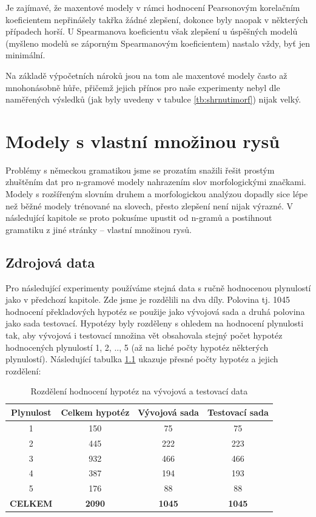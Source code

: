 \documentclass[12pt,a4paper]{report}
\begin{document}
Je zajímavé, že maxentové modely v rámci hodnocení Pearsonovým korelačním koeficientem nepřinášely takřka žádné zlepšení, dokonce byly naopak v některých případech horší. U Spearmanova koeficientu však zlepšení u úspěšných modelů (myšleno modelů se záporným Spearmanovým koeficientem) nastalo vždy, byť jen minimální.

Na základě výpočetních nároků jsou na tom ale maxentové modely často až mnohonásobně hůře, přičemž jejich přínos pro naše experimenty nebyl dle naměřených výsledků (jak byly uvedeny v tabulce \ref{tb:shrnutimorf}) nijak velký.


\chapter{Modely s vlastní množinou rysů}
Problémy s německou gramatikou jsme se prozatím snažili řešit prostým zhuštěním dat pro n-gramové modely nahrazením slov morfologickými značkami. Modely s rozšířeným slovním druhem a morfologickou analýzou dopadly sice lépe než běžné modely trénované na slovech, přesto zlepšení není nijak výrazné. V následující kapitole se proto pokusíme upustit od n-gramů a postihnout gramatiku z jiné stránky -- vlastní množinou rysů.

\section{Zdrojová data}

Pro následující experimenty používáme stejná data s ručně hodnocenou plynulostí jako v předchozí kapitole. Zde jsme je rozdělili na dva díly. Polovina tj. 1045 hodnocení překladových hypotéz se použije jako vývojová sada a druhá polovina jako sada testovací. Hypotézy byly rozděleny s ohledem na hodnocení plynulosti tak, aby vývojová i testovací množina vět obsahovala stejný počet hypotéz hodnocených plynulostí 1, 2, .., 5 (až na liché počty hypotéz některých plynulostí). Následující tabulka \ref{tb:rozdeleni} ukazuje přesné počty hypotéz a jejich rozdělení:

\begin{table}[!htbp]
\begin{center}\begin{tabular}{|c|c|c|c|}
	\hline
	\textbf{Plynulost} & \textbf{Celkem hypotéz} & \textbf{Vývojová sada} & \textbf{Testovací sada}\\
	\hline
	1 & 150 & 75 & 75\\
	\hline
	2 & 445 & 222 & 223\\
	\hline
	3 & 932 & 466 & 466\\
	\hline
	4 & 387 & 194 & 193\\
	\hline
	5 & 176 & 88 & 88\\
	\hline
	\hline	
	\multicolumn{1}{c}{\textbf{CELKEM}} & \multicolumn{1}{c}{\textbf{2090}} & \multicolumn{1}{c}{\textbf{1045}} & \multicolumn{1}{c}{\textbf{1045}}\\
\end{tabular}
\caption{Rozdělení hodnocení hypotéz na vývojová a testovací data}\label{tb:rozdeleni}
\end{center}\end{table}
\end{document}
